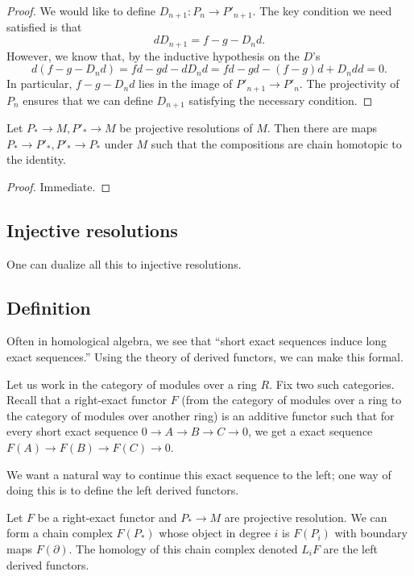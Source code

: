 \begin{proof}
We would like to define $D_{n+1}: P_n \to P'_{n+1}$. 
The key condition we need satisfied is that
\[ d D_{n+1} = f - g - D_n d.  \]
However, we know that, by the inductive hypothesis on the $D$'s
\[ d( f- g - D_{n}d) = fd  - gd - dD_n d = fd - gd - (f-g)d + D_n dd = 0.  \]
In particular, $f-g - D_n d$ lies in the image of $P'_{n+1} \to P'_n$.
The projectivity of $P_n$ ensures that we can define $D_{n+1}$ satisfying the
necessary condition. 

\end{proof} 


\begin{corollary} 
Let $P_* \to M, P'_* \to M$ be projective resolutions of $M$. Then there are
maps $P_* \to P'_*, P'_* \to P_* $ under $M$ such that the compositions are
chain homotopic to the identity.
\end{corollary} 
\begin{proof} 
Immediate.
\end{proof} 

\subsection{Injective resolutions}

One can dualize all this to injective resolutions. 

\subsection{Definition}
Often in homological algebra, we see that ``short exact
sequences induce long exact sequences.'' Using the theory of
derived functors, we can make this formal.

Let us work in the category of modules over a ring $R$. Fix two such categories.
Recall that a right-exact functor $F$ (from the category of modules over a
ring to the category of modules over another ring) is an additive functor
 such that for every short
exact sequence $0\rightarrow A\rightarrow B\rightarrow
C\rightarrow 0$, we get a exact sequence $F(A)\rightarrow
F(B)\rightarrow F(C)\rightarrow 0$.

We want a natural way to continue this exact sequence to the
left; one way of doing this is to define the left derived
functors.
\begin{definition} Let $F$ be a right-exact functor and
$P_*\rightarrow M$ are projective resolution. We can form a
chain complex $F(P_*)$ whose object in degree $i$ is $F(P_i)$
with boundary maps $F(\partial)$. The homology of this chain
complex denoted $L_iF$ are the left derived functors.
\end{definition}

